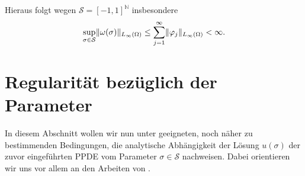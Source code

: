 Hieraus folgt wegen $\mathcal S = [-1, 1]^{\mathbb{N}}$ insbesondere
\begin{equation}
    \sup_{\sigma \in \mathcal S} \lVert\omega(\sigma)\rVert_{L_{\infty}(\Omega)} \leq \sum_{j = 1}^{\infty} \lVert\varphi_{j}\rVert_{L_{\infty}(\Omega)} < \infty.
\end{equation}



\section{Regularität bezüglich der Parameter} %
\label{sec:regularit_t_bez_glich_der_parameter}

In diesem Abschnitt wollen wir nun unter geeigneten, noch näher zu bestimmenden Bedingungen, die analytische Abhängigkeit der Lösung $u(\sigma)$ der zuvor eingeführten PPDE vom Parameter $\sigma \in \mathcal S$ nachweisen.
Dabei orientieren wir uns vor allem an den Arbeiten von \textcite{Cohen:2010kz,Kunoth:2013ef}.

